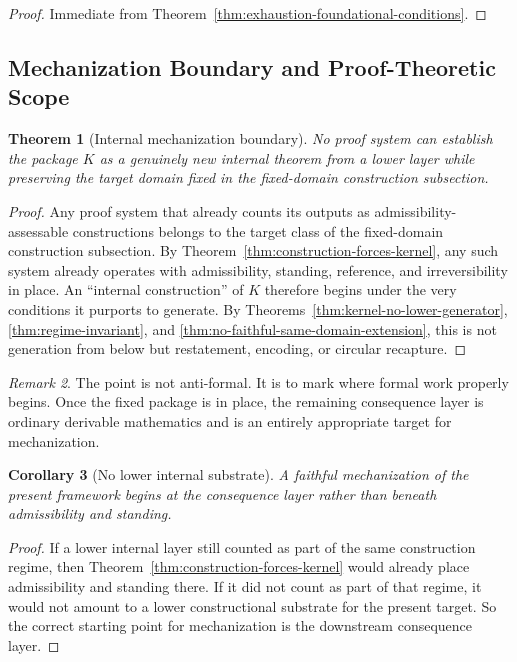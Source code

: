 \documentclass[11pt]{article}
\newtheorem{theorem}{Theorem}[section]
\newtheorem{corollary}[theorem]{Corollary}
\theoremstyle{definition}
\theoremstyle{remark}
\newtheorem{remark}[theorem]{Remark}
\begin{document}
\begin{proof}
Immediate from Theorem~\ref{thm:exhaustion-foundational-conditions}.
\end{proof}

\subsection{Mechanization Boundary and Proof-Theoretic Scope}

\begin{theorem}[Internal mechanization boundary]
No proof system can establish the package $K$ as a genuinely new internal theorem from a lower layer while preserving the target domain fixed in the fixed-domain construction subsection.
\end{theorem}

\begin{proof}
Any proof system that already counts its outputs as admissibility-assessable constructions belongs to the target class of the fixed-domain construction subsection. By Theorem~\ref{thm:construction-forces-kernel}, any such system already operates with admissibility, standing, reference, and irreversibility in place. An ``internal construction'' of $K$ therefore begins under the very conditions it purports to generate. By Theorems~\ref{thm:kernel-no-lower-generator}, \ref{thm:regime-invariant}, and \ref{thm:no-faithful-same-domain-extension}, this is not generation from below but restatement, encoding, or circular recapture.
\end{proof}

\begin{remark}
The point is not anti-formal. It is to mark where formal work properly begins. Once the fixed package is in place, the remaining consequence layer is ordinary derivable mathematics and is an entirely appropriate target for mechanization.
\end{remark}

\begin{corollary}[No lower internal substrate]
A faithful mechanization of the present framework begins at the consequence layer rather than beneath admissibility and standing.
\end{corollary}

\begin{proof}
If a lower internal layer still counted as part of the same construction regime, then Theorem~\ref{thm:construction-forces-kernel} would already place admissibility and standing there. If it did not count as part of that regime, it would not amount to a lower constructional substrate for the present target. So the correct starting point for mechanization is the downstream consequence layer.
\end{proof}
\end{document}

